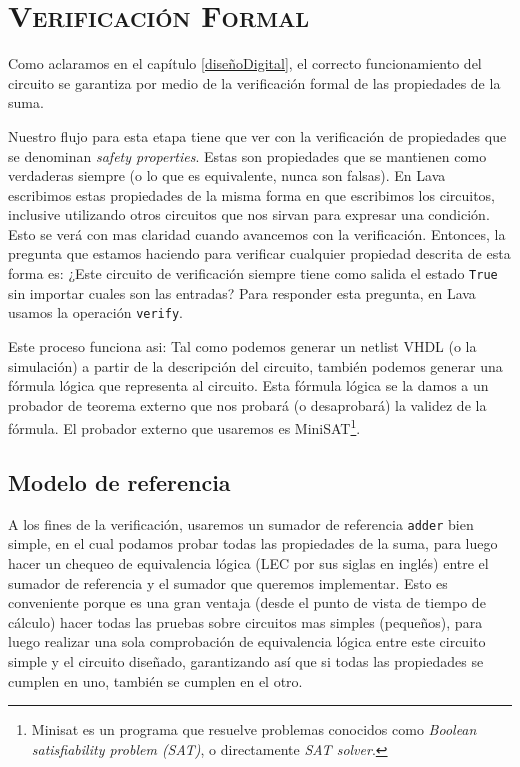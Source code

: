 

\chapter{ \textsc{ Verificación Formal } }\label{verificacion}

Como aclaramos en el capítulo \ref{diseñoDigital}, el correcto funcionamiento del circuito se garantiza por medio de la verificación formal de las propiedades de la suma. 

Nuestro flujo para esta etapa tiene que ver con la verificación de propiedades que se denominan \emph{safety properties}. Estas  son propiedades que se mantienen como verdaderas siempre (o lo que es equivalente, nunca son falsas). En Lava escribimos estas propiedades de la misma forma en que escribimos los circuitos, inclusive utilizando otros circuitos que nos sirvan para expresar una condición. Esto se verá con mas claridad cuando avancemos con la verificación. Entonces, la pregunta que estamos haciendo para verificar cualquier propiedad descrita de esta forma es:  ¿Este circuito de verificación siempre tiene como salida el estado \verb.True. sin importar cuales son las entradas? Para responder esta pregunta, en Lava usamos la operación \verb.verify..

Este proceso funciona asi: Tal como podemos generar un netlist VHDL (o la simulación) a partir de la descripción del circuito, también podemos generar una fórmula lógica que representa al circuito. Esta fórmula lógica se la damos a un probador de teorema externo que nos probará (o desaprobará) la validez de la fórmula. El probador externo que usaremos es MiniSAT\cite{minisat}\footnote{Minisat es un programa que resuelve problemas conocidos como \emph{Boolean satisfiability problem (SAT)}, o directamente \emph{SAT solver}.}.

\section{Modelo de referencia}
A los fines de la verificación, usaremos un sumador de referencia \verb.adder. bien simple, en el cual podamos probar todas las propiedades de la suma, para luego hacer un chequeo de equivalencia lógica (LEC por sus siglas en inglés) entre el sumador de referencia y el sumador que queremos implementar. Esto es conveniente porque es una gran ventaja (desde el punto de vista de tiempo de cálculo) hacer todas las pruebas sobre circuitos mas simples (pequeños), para luego realizar una sola comprobación de equivalencia lógica entre este circuito simple y el circuito diseñado, garantizando así que si todas las propiedades se cumplen en uno, también se cumplen en el otro.


